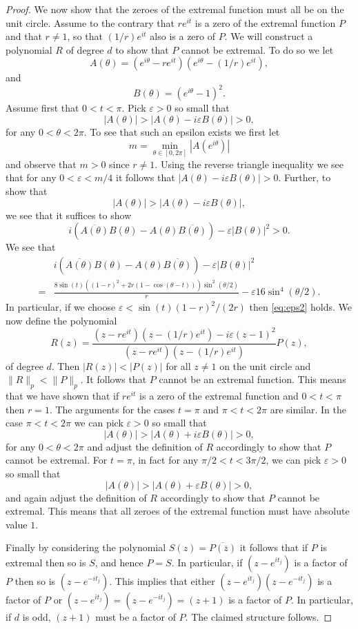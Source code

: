 \documentclass{amsart}
\theoremstyle{plain}
\theoremstyle{remark}
\begin{document}
\begin{proof}
		We now show that the zeroes of the extremal function must all be on the unit circle. Assume to the contrary that $re^{i t}$ is a zero of the extremal function $P$ and that $r \neq 1$, so that $(1/r) e^{i t}$ also is a zero of $P$. We will construct a polynomial $R$ of degree $d$ to show that $P$ cannot be extremal. To do so we let \[A(\theta)=(e^{i \theta}-re^{it})(e^{i \theta}-(1/r)e^{it}),\]
		and \[B(\theta)=(e^{i \theta}-1)^2.\]
		Assume first that $0<t<\pi$. Pick $\varepsilon>0$ so small that 
		\[|A(\theta)| > |A(\theta)-i\varepsilon B(\theta)|>0, \]
		for any $0<\theta<2 \pi$. To see that such an epsilon exists we first let \[m=\min_{\theta \in [0, 2\pi]} |A(e^{i\theta})|\] and observe that $m>0$ since $r \neq 1$. Using the reverse triangle inequality we see that for any $0<\varepsilon<m/4$ it follows that $|A(\theta)-i\varepsilon B(\theta)|>0$. Further, to show that 
		\begin{equation}\label{eq:eps2}
			|A(\theta)| > |A(\theta)-i\varepsilon B(\theta)|,
		\end{equation}
		we see that it suffices to show
		\[i(\overline{A(\theta)}B(\theta)-A(\theta)\overline{B(\theta)})-\varepsilon|B(\theta)|^2>0.\]  
		We see that
		\[\begin{split}
			&i(\overline{A(\theta)}B(\theta)-A(\theta)\overline{B(\theta)})-\varepsilon|B(\theta)|^2 \\ =&\frac{8 \sin(t)((1-r)^2+2r(1-\cos(\theta-t))) \sin^2(\theta/2)}{r}-\varepsilon16 \sin^4(\theta/2).
		\end{split}\]
		In particular, if we choose $\varepsilon<\sin(t)(1-r)^2/(2r)$ then \eqref{eq:eps2} holds. We now define the polynomial 
		\[R(z)=\frac{(z-re^{it})(z-(1/r)e^{it})-i\varepsilon (z-1)^2}{(z-re^{it})(z-(1/r)e^{it})} P(z),\] of degree $d$. Then $|R(z)|<|P(z)|$ for all $z \neq 1$ on the unit circle and $\|R\|_p < \|P\|_p$. It follows that $P$ cannot be an extremal function. This means that we have shown that if $re^{it}$ is a zero of the extremal function and $0<t<\pi$ then $r=1$. The arguments for the cases $t=\pi$ and $\pi<t<2\pi$ are similar. In the case $\pi<t<2\pi$ we can pick $\varepsilon>0$ so small that \[|A(\theta)| > |A(\theta)+i\varepsilon B(\theta)|>0, \]
		for any $0<\theta<2 \pi$ and adjust the definition of $R$ accordingly to show that $P$ cannot be extremal. For $t=\pi$, in fact for any $\pi/2 < t < 3\pi/2$, we can pick 
		$\varepsilon>0$ so small that \[|A(\theta)| > |A(\theta)+\varepsilon B(\theta)|>0, \]
		and again adjust the definition of $R$ accordingly to show that $P$ cannot be extremal. This means that all zeroes of the extremal function must have absolute value $1$. 
		
		Finally by considering the polynomial $S(z)=\overline{P(\overline{z})}$ it follows that if $P$ is extremal then so is $S$, and hence $P=S$. In particular, if $(z-e^{it_j})$ is a factor of $P$ then so is $(z-e^{-it_j})$. This implies that either $(z-e^{it_j})(z-e^{-it_j})$ is a factor of $P$ or $(z-e^{it_j})=(z-e^{-it_j})=(z+1)$ is  a factor of $P$. In particular, if $d$ is odd, $(z+1)$ must be a factor of $P$. The claimed structure follows.
	\end{proof}
\end{document}
